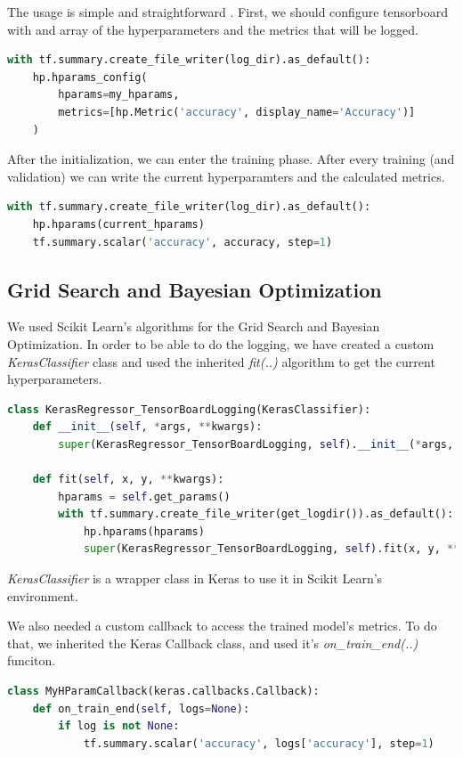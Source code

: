 \documentclass[conference]{IEEEtran}
\begin{document}
The usage is simple and straightforward \cite{tensorboard}. First, we should configure tensorboard with and array of the hyperparameters and the metrics that will be logged.
\begin{lstlisting}[language=Python]
with tf.summary.create_file_writer(log_dir).as_default():
    hp.hparams_config(
        hparams=my_hparams,
        metrics=[hp.Metric('accuracy', display_name='Accuracy')]
    )
\end{lstlisting}
After the initialization, we can enter the training phase. After every training (and validation) we can write the current hyperparamters and the calculated metrics.
\begin{lstlisting}[language=Python]
with tf.summary.create_file_writer(log_dir).as_default():
    hp.hparams(current_hparams)
    tf.summary.scalar('accuracy', accuracy, step=1)
\end{lstlisting}

\subsection{Grid Search and Bayesian Optimization}
We used Scikit Learn's algorithms for the Grid Search and Bayesian Optimization. In order to be able to do the logging, we have created a custom \emph{KerasClassifier} class and used the inherited \emph{fit(..)} algorithm to get the current hyperparameters.
\begin{lstlisting}[language=Python]
class KerasRegressor_TensorBoardLogging(KerasClassifier):
    def __init__(self, *args, **kwargs):
        super(KerasRegressor_TensorBoardLogging, self).__init__(*args, **kwargs)

    def fit(self, x, y, **kwargs):
        hparams = self.get_params()
        with tf.summary.create_file_writer(get_logdir()).as_default():
            hp.hparams(hparams)
            super(KerasRegressor_TensorBoardLogging, self).fit(x, y, **kwargs)
\end{lstlisting}
\emph{KerasClassifier} is a wrapper class in Keras to use it in Scikit Learn's environment.

We also needed a custom callback to access the trained model's metrics. To do that, we inherited the Keras Callback class, and used it's \emph{on\_train\_end(..)} funciton.
\begin{lstlisting}[language=Python]
class MyHParamCallback(keras.callbacks.Callback):
    def on_train_end(self, logs=None):
        if log is not None:
            tf.summary.scalar('accuracy', logs['accuracy'], step=1)
\end{lstlisting}
\end{document}

